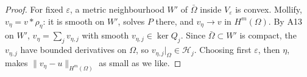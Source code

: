 \begin{proof}
For fixed $\varepsilon$, a metric neighbourhood $W'$ of $\bar\Omega$ inside $V_\varepsilon$ is convex. Mollify, $v_\eta=v*\rho_\eta$: it is smooth on $W'$, solves $P$ there, and $v_\eta\to v$ in $H^m(\Omega)$. By A13 on $W'$, $v_\eta=\sum_jv_{\eta,j}$ with smooth $v_{\eta,j}\in\ker Q_j$. Since $\bar\Omega\subset W'$ is compact, the $v_{\eta,j}$ have bounded derivatives on $\Omega$, so $v_{\eta,j}|_\Omega\in\mathcal H_j$. Choosing first $\varepsilon$, then $\eta$, makes $\|v_\eta-u\|_{H^m(\Omega)}$ as small as we like.

\end{proof}
